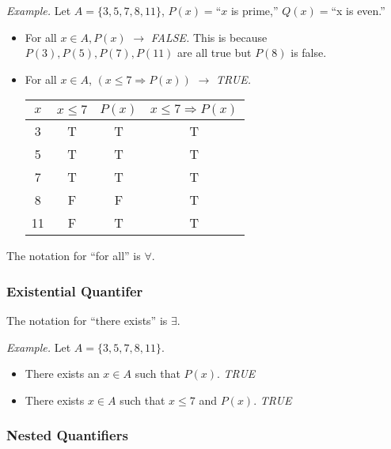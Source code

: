\documentclass[11pt]{article}
\begin{document}
    \emph{Example.} Let \(A = \{3,5,7,8,11\}\), \(P(x) = \)``$x$ is prime,'' \(Q(x) = \)``x is even.''
    \begin{itemize}
        \item For all \(x \in A, P(x)\) \(\rightarrow\) \emph{FALSE.} This is because \(P(3),P(5),P(7),P(11)\) are all true but \(P(8)\) is false.
        \item For all \(x \in A\), \((x \leq 7 \Rightarrow P(x))\) \(\rightarrow\) \emph{TRUE.}
        \begin{center}
            \begin{tabular}{|c | c | c | c |} \hline
                $x$ & $x \leq 7$ & $P(x)$ & $x \leq 7 \Rightarrow P(x)$ \\ \hline
                3   & T          & T      & T                           \\ \hline
                5   & T          & T      & T                           \\ \hline
                7   & T          & T      & T                           \\ \hline
                8   & F          & F      & T                           \\ \hline
                11  & F          & T      & T                           \\ \hline
            \end{tabular}
        \end{center}
    \end{itemize}

    The notation for ``for all'' is \(\forall\).

    \subsubsection{Existential Quantifer}

    The notation for ``there exists'' is \(\exists\).

    \vspace{1em}

    \emph{Example.} Let \(A = \{3,5,7,8,11\}\).
    \begin{itemize}
        \item There exists an \(x \in A\) such that \(P(x)\). \emph{TRUE}
        \item There exists \(x \in A\) such that \(x \leq 7\) and \(P(x)\). \emph{TRUE}
    \end{itemize}

    \subsubsection{Nested Quantifiers}
\end{document}
